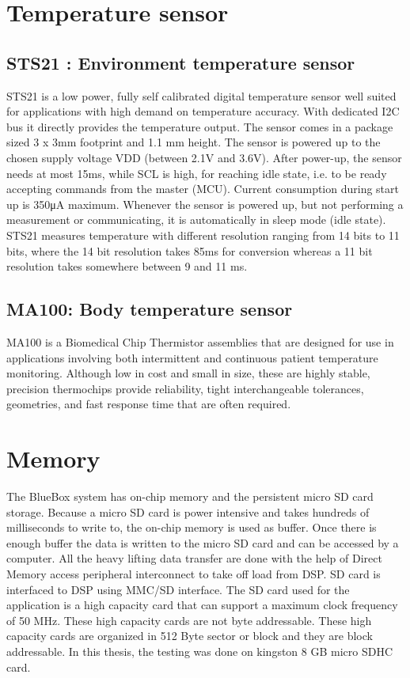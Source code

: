 \section{Temperature sensor}
\subsection{ STS21 : Environment temperature sensor}
STS21 is a low power, fully self calibrated digital temperature sensor well suited for applications with high demand on temperature accuracy. With dedicated I2C bus it directly provides the temperature output. The sensor comes in a package sized 3 x 3mm footprint and 1.1 mm height. The sensor is powered up to the chosen supply voltage VDD (between 2.1V and 3.6V). After power-up, the sensor needs at most 15ms, while SCL is high, for reaching idle state, i.e. to be ready accepting commands from the master (MCU). Current consumption during start up is 350μA maximum. Whenever the sensor is powered up, but not performing a measurement or communicating, it is automatically in sleep mode (idle state). STS21 measures temperature with different resolution ranging from 14 bits to 11 bits, where the 14 bit resolution takes 85ms for conversion whereas a 11 bit resolution takes somewhere between 9 and 11 ms.  

\subsection{MA100: Body temperature sensor} 
MA100 is a Biomedical Chip Thermistor assemblies that are designed for use in applications involving both intermittent and continuous patient temperature monitoring. Although low in cost and small in size, these are highly stable, precision thermochips provide reliability, tight interchangeable tolerances, geometries, and fast response time that are often required.
 
\section{Memory}\label{memory}
The BlueBox system has on-chip memory and the persistent micro SD card storage. Because a micro SD card is power intensive and takes hundreds of milliseconds to write to, the on-chip memory is used as buffer. Once there is enough buffer the data is written to the micro SD card and can be accessed by a computer. All the heavy lifting data transfer are done with the help of Direct Memory access peripheral interconnect to take off load from DSP. SD card is interfaced to DSP using MMC/SD interface. The SD card used for the application is a high capacity card that can support a maximum clock frequency of 50 MHz. These high capacity cards are not byte addressable. These high capacity cards are organized in 512 Byte sector or block and they are block addressable. In this thesis, the testing was done on kingston 8 GB micro SDHC card. 

